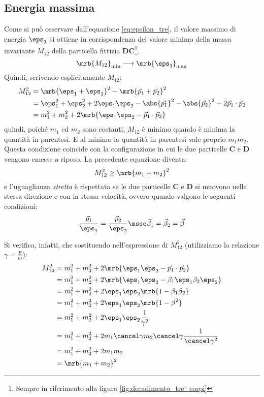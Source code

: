 \subsection{Energia massima}
Come si può osservare dall'equazione \ref{eq:epsilon_tre}, il valore massimo di
energia $\eps_3$ si ottiene in corrispondenza del valore minimo della
massa invariante $M_{12}$ della particella fittizia $\boldsymbol{DC}$\footnote{
	Sempre in riferimento alla figura \ref{fig:decadimento_tre_corpi}
}.
\begin{equation}
	\mrb{M_{12}}_{\text{min}} \longrightarrow \mrb{\eps_3}_{\text{max}}
\end{equation}
Quindi, scrivendo esplicitamente $M_{12}$:
\begin{align}
	M_{12}^2
	 & = \mrb{\eps_1 + \eps_2}^2 - \mrb{\vec{p}_1 + \vec{p}_2}^2
	\\\notag
	 & = \eps_1^2 + \eps_2^2 + 2 \eps_1 \eps_2 - \abs{\vec{p_1}}^{2} -
	\abs{\vec{p}_{2}}^{2} - 2 \vec{p}_{1} \cdot \vec{p}_{2}
	\\\notag
	 & = m_1^2 + m_2^2 + 2 \mrb{\eps_1 \eps_2 - \vec{p}_1 \cdot
		\vec{p}_2}
\end{align}
quindi, poiché $m_1$ ed $m_2$ sono costanti, $M_{12}$ è minimo quando è minima
la quantità in parentesi. E al minimo la quantità in parentesi vale proprio
$m_1 m_2$. Questa condizione coincide con la configurazione in cui le due
particelle $\boldsymbol{C}$ e $\boldsymbol{D}$ vengono emesse a riposo.
La precedente equazione diventa:
\begin{equation}
	M_{12}^2 \geq \mrb{m_1 + m_2}^2
\end{equation}
e l'uguaglianza \textit{stretta} è rispettata se le due particelle
$\boldsymbol{C}$ e $\boldsymbol{D}$ si muovono nella stessa direzione e con la
stessa velocità, ovvero quando valgono le seguenti condizioni:
\begin{equation}
	\frac{\vec{p}_1}{\eps_1} = \frac{\vec{p}_2}{\eps_2}
	\msse
	\vec{\beta}_1 = \vec{\beta}_2 =\vec{\beta}
\end{equation}

Si verifica, infatti, che sostituendo nell'espressione di $M_{12}^2$
(utilizziamo la relazione $\gamma = \frac{E}{m}$):
\begin{align}
	M_{12}^2
	 & = m_1^2 + m_2^2 + 2 \mrb{\eps_1 \eps_2 - \vec{p}_1 \cdot
		\vec{p}_2}
	\\\notag
	 & = m_1^2 + m_2^2 + 2 \mrb{\eps_1 \eps_2 -
		\beta_1\eps_1 \beta_2\eps_2}
	\\\notag
	 & = m_1^2 + m_2^2 + 2 \eps_1 \eps_2 \mrb{1 - \beta_1 \beta_2}
	\\\notag
	 & = m_1^2 + m_2^2 + 2 \eps_1 \eps_2 \mrb{1 - \beta^2}
	\\\notag
	 & = m_1^2 + m_2^2 + 2 \eps_1 \eps_2 \frac{1}{\gamma^2}
	\\\notag
	 & = m_1^2 + m_2^2 + 2 m_1 \cancel\gamma m_2 \cancel\gamma
	\frac{1}{\cancel\gamma^2}
	\\\notag
	 & = m_1^2 + m_2^2 + 2 m_1 m_2
	\\\notag
	 & = \mrb{m_1 + m_2}^2
\end{align}

